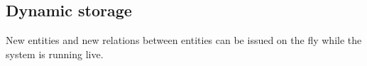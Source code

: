 \documentclass[english,a4paper]{article}
\begin{document}
\subsection{Dynamic storage}

New entities and new relations between entities can be issued on the
fly while the system is running live.  





\end{document}
